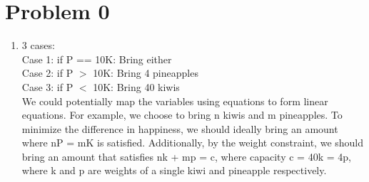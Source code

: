 \documentclass[12pt,letterpaper]{article}
\begin{document}
\section*{Problem 0}
\begin{enumerate}
  \item
    3 cases: \\
    Case 1: if P == 10K: Bring either \\
    Case 2: if P $>$ 10K: Bring 4 pineapples \\
    Case 3: if P $<$ 10K: Bring 40 kiwis \\

    We could potentially map the variables using equations to form linear equations.
    For example, we choose to bring n kiwis and m pineapples.
    To minimize the difference in happiness,
    we should ideally bring an amount where nP = mK is satisfied.
    Additionally, by the weight constraint, we should bring an amount
    that satisfies nk + mp = c, where capacity c = 40k = 4p, where k and p
    are weights of a single kiwi and pineapple respectively. \\


\end{enumerate}
\end{document}
